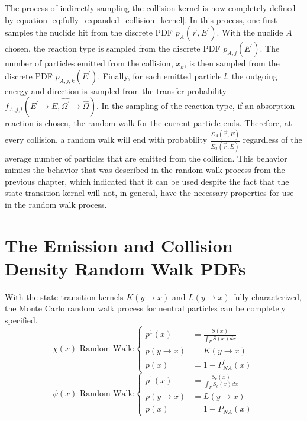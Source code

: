 The process of indirectly sampling the collision kernel is now completely
defined by equation \ref{eq:fully_expanded_collision_kernel}. In this process,
one first samples the nuclide hit from the discrete PDF $p_A(\vec{r},E^{'})$.
With the nuclide $A$ chosen, the reaction type is sampled from the discrete
PDF $p_{A,j}(E^{'})$. The number of particles emitted from the collision, $x_k$, 
is then sampled from the discrete PDF $p_{A,j,k}(E^{'})$. Finally, for each 
emitted particle $l$, the outgoing energy and direction is sampled from the
transfer probability $f_{A,j,l}(E^{'} \to E,\hat{\Omega^{'}} \to \hat{\Omega})$.
In the sampling of the reaction type, if an absorption reaction is chosen,
the random walk for the current particle ends. Therefore, at every collision,
a random walk will end with probability 
$\frac{\Sigma_A(\vec{r},E)}{\Sigma_T(\vec{r},E)}$ regardless of the average 
number of particles that are emitted from the collision. This behavior 
mimics the behavior that was described in the random walk process from the
previous chapter, which indicated that it can be used despite the fact that 
the state transition kernel will not, in general, have the necessary properties
for use in the random walk process. 

\section{The Emission and Collision Density Random Walk PDFs}
With the state transition kernels $K(y \to x)$ and $L(y \to x)$ fully 
characterized, the Monte Carlo random walk process for neutral particles can 
be completely specified. 
\begin{equation}
  \chi(x)\text{ Random Walk:}
  \begin{cases}
    p^1(x) & = \frac{S(x)}{\int_{\Gamma} S(x)dx} \\
    p(y \to x) &  = K(y \to x) \\
    p(x) & = 1 - P_{NA}^{'}(x)
  \end{cases}
  \label{eq:mc_random_walk_emission_dens}
\end{equation}
\begin{equation}
  \psi(x)\text{ Random Walk:}
  \begin{cases}
    p^1(x) & = \frac{S_c(x)}{\int_{\Gamma} S_c(x)dx} \\
    p(y \to x) & = L(y \to x) \\
    p(x) & = 1 - P_{NA}(x)
  \end{cases}
  \label{eq:mc_random_walk_collision_dens}
\end{equation}

